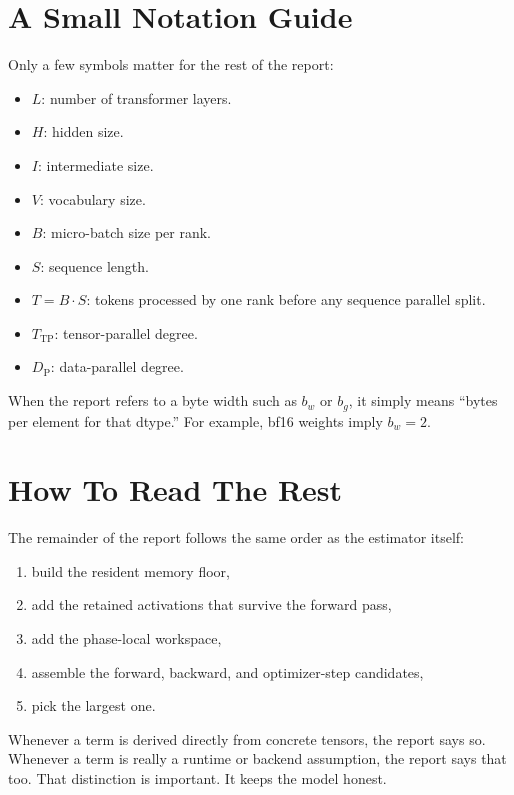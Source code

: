 \section{A Small Notation Guide}
Only a few symbols matter for the rest of the report:
\begin{itemize}[leftmargin=1.5em]
\item $L$: number of transformer layers.
\item $H$: hidden size.
\item $I$: intermediate size.
\item $V$: vocabulary size.
\item $B$: micro-batch size per rank.
\item $S$: sequence length.
\item $T = B \cdot S$: tokens processed by one rank before any sequence
parallel split.
\item $T_{\mathrm{TP}}$: tensor-parallel degree.
\item $D_{\mathrm{P}}$: data-parallel degree.
\end{itemize}

When the report refers to a byte width such as $b_w$ or $b_g$, it simply means
``bytes per element for that dtype.'' For example, bf16 weights imply
$b_w = 2$.

\section{How To Read The Rest}
The remainder of the report follows the same order as the estimator itself:
\begin{enumerate}[leftmargin=1.5em]
\item build the resident memory floor,
\item add the retained activations that survive the forward pass,
\item add the phase-local workspace,
\item assemble the forward, backward, and optimizer-step candidates,
\item pick the largest one.
\end{enumerate}

Whenever a term is derived directly from concrete tensors, the report says so.
Whenever a term is really a runtime or backend assumption, the report says that
too. That distinction is important. It keeps the model honest.
